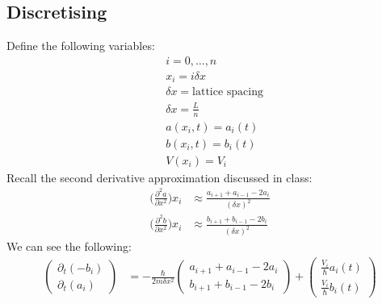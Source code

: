 \documentclass[11pt,letterpaper]{article}
\begin{document}
	\subsection{Discretising}
	Define the following variables:
	\begin{align*}
		&i = 0,\ldots,n\\
		&x_i  =  i\delta x\\
		&\delta x = \text{lattice spacing}\\
		&\delta x = \frac{L}{n}\\
		&a(x_i,t) = a_i(t)\\
		&b(x_i,t) = b_i(t)\\
		&V(x_i) = V_i
	\end{align*}
	Recall the second derivative approximation discussed in class:
	\begin{align*}
		\Big( \frac{\partial^2 a}{\partial x^2} \Big) x_i &\approx \frac{a_{i+1}+a_{i-1}-2a_i}{{(\delta x)}^2}\\
		\Big( \frac{\partial^2 b}{\partial x^2} \Big) x_i &\approx \frac{b_{i+1}+b_{i-1}-2b_i}{{(\delta x)}^2}
	\end{align*}
	We can see the following:
	\begin{align*}
		\begin{pmatrix}
			\partial_t (-b_i)\\
			\partial_t (a_i)
		\end{pmatrix}
		&=
		-\frac{\hbar}{2m \delta x^2}
		\begin{pmatrix}
			a_{i+1}+a_{i-1}-2a_i\\
			b_{i+1}+b_{i-1}-2b_i
		\end{pmatrix}
		+
		\begin{pmatrix}
			\frac{V_i}{\hbar} a_i(t)\\
			\frac{V_i}{\hbar} b_i(t)
		\end{pmatrix}
	\end{align*}
\end{document}
